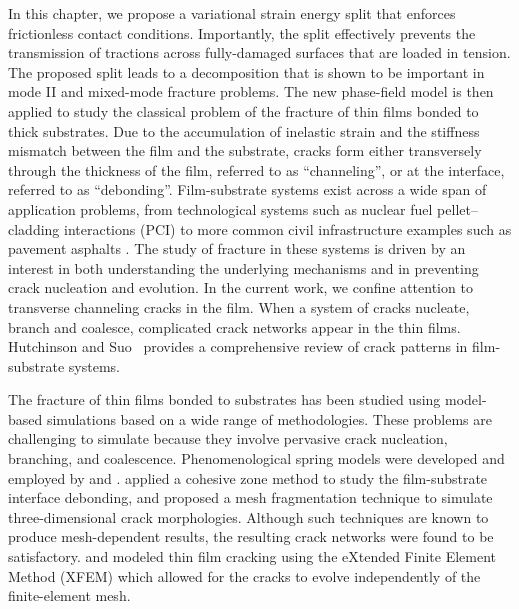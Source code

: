 In this chapter, we propose a variational strain energy split that enforces frictionless contact conditions.  Importantly, the split effectively prevents the transmission of tractions across fully-damaged surfaces that are loaded in tension.
The proposed split leads to a decomposition that is shown to be important in mode II and mixed-mode fracture problems.
The new phase-field model is then applied to study the classical problem of the fracture of thin films bonded to thick substrates.  Due to the accumulation of inelastic strain and the stiffness mismatch between the film and the substrate, cracks form either transversely through the thickness of the film, referred to as ``channeling'', or at the interface, referred to as ``debonding''.  Film-substrate systems exist across a wide span of application problems, from technological systems such as nuclear fuel pellet--cladding interactions (PCI) \cite{roberts1977pellet, michel20083d, jernkvist1995model, nagase2004effect, billone2008cladding}
to more common civil infrastructure examples such as pavement asphalts \cite{el2005calibration, el2009methodology, saar2010automatic, button2007guidelines, yildirim2006field}.
The study of fracture in these systems is driven by an interest in both understanding the underlying mechanisms and in preventing crack nucleation and evolution.  In the current work, we confine attention to transverse channeling cracks in the film.  When a system of cracks nucleate, branch and coalesce, complicated crack networks appear in the thin films. Hutchinson and Suo~\cite{hutchinson1991mixed} provides a
comprehensive review of crack patterns in film-substrate systems.

The fracture of thin films bonded to substrates has been studied using model-based simulations based on a wide range of methodologies.  These problems are challenging to simulate because they involve pervasive crack nucleation, branching, and coalescence.   Phenomenological spring models were developed and employed by \citet{crosby1997fragmentation, leung2000pattern} and \citet{ sadhukhan2011crack}. \citet{zhang2017modeling} applied a cohesive zone method to study the film-substrate interface debonding, and \citet{sanchez2014modeling}
proposed a mesh fragmentation technique to simulate three-dimensional crack morphologies. Although such techniques are known to produce mesh-dependent results, the resulting crack networks were found to be satisfactory. \citet{liang2003evolving, sukumar2003modeling} and \citet{huang2003modeling} modeled thin film cracking using the eXtended Finite Element Method (XFEM) which allowed for the cracks to evolve independently of the finite-element mesh.

